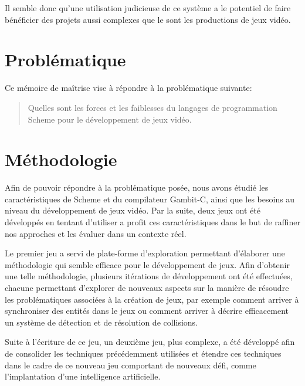 \documentclass[12pt,oneside,letterpaper,francais]{book}
\begin{document}
Il semble donc qu'une utilisation judicieuse de ce système a le
potentiel de faire bénéficier des projets aussi complexes que le sont
les productions de jeux vidéo.

\section{Problématique}
Ce mémoire de maîtrise vise à répondre à la problématique suivante:

\begin{quote}
  Quelles sont les forces et les faiblesses du langages de
  programmation Scheme pour le développement de jeux vidéo.
\end{quote}

\section{Méthodologie}



Afin de pouvoir répondre à la problématique posée, nous avons étudié
les caractéristiques de Scheme et du compilateur Gambit-C, ainsi que
les besoins au niveau du développement de jeux vidéo. Par la suite,
deux jeux ont été développés en tentant d'utiliser a profit ces
caractéristiques dans le but de raffiner nos approches et les évaluer
dans un contexte réel.

Le premier jeu a servi de plate-forme d'exploration permettant
d'élaborer une méthodologie qui semble efficace pour le développement
de jeux. Afin d'obtenir une telle méthodologie, plusieurs itérations
de développement ont été effectuées, chacune permettant d'explorer de
nouveaux aspects sur la manière de résoudre les problématiques
associées à la création de jeux, par exemple comment arriver à
synchroniser des entités dans le jeux ou comment arriver à décrire
efficacement un système de détection et de résolution de collisions.

Suite à l'écriture de ce jeu, un deuxième jeu, plus complexe, a été
développé afin de consolider les techniques précédemment utilisées et
étendre ces techniques dans le cadre de ce nouveau jeu comportant de
nouveaux défi, comme l'implantation d'une intelligence artificielle.
\end{document}
